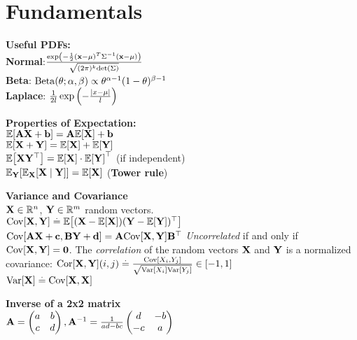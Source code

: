 \section{Fundamentals}
\begin{framed}
    \textbf{Useful PDFs:} \\
    \textbf{Normal}:$\frac{\exp \left(-\frac{1}{2}(\mathbf{x} - \mathbf{\mu})^T \Sigma^{-1} (\mathbf{x} - \mathbf{\mu}) \right)}{\sqrt{(2\pi)^k \mathrm{det}\left(\Sigma\right)}}$ \\
    \textbf{Beta}: $\Beta[\theta]{\alpha}{\beta} \propto \theta^{\alpha-1} (1-\theta)^{\beta-1}$ \\
    \textbf{Laplace}: $\frac{1}{2l}\exp\left(-\frac{\left| x - \mu \right|}{l}\right)$
\end{framed}
\begin{framed}
    \textbf{Properties of Expectation:}\\
    $\E{\mA \rX + \vb} = \mA \E{\rX} + \vb $\\ 
    $ \E{\rX + \rY} = \E{\rX} + \E{\rY}$ \\
    $\E{\rX\transpose{\rY}} = \E{\rX} \cdot \transpose{\E{\rY}}$ (if independent)\\
    $\E[\rY]{\E[\rX]{\rX \mid \rY}} = \E{\rX}$ (\textbf{Tower rule})
\end{framed} 
\begin{framed}
    \textbf{Variance and Covariance}\\
$\mathbf{X}\in \mathbb{R}^n$, $\mathbf{Y} \in \mathbb{R}^m$ random vectors.\\
  $\Cov{\rX, \rY} \defeq \E{(\rX - \E{\rX})\transpose{(\rY - \E{\rY})}}$\\
$\Cov{\mA\rX + \vc, \mB\rY + \vd} = \mA\Cov{\rX,\rY}\transpose{\mB}$
\emph{Uncorrelated} if and only if $\Cov{\rX, \rY} = \mzero$.
The \emph{correlation} of the random vectors $\mathbf{X}$ and $\mathbf{Y}$ is a normalized covariance: $\Cor{\rX,\rY}(i,j) \defeq \frac{\Cov{X_i,Y_j}}{\sqrt{\Var{X_i} \Var{Y_j}}} \in [-1,1]$\\
$\Var{\rX} \defeq \Cov{\rX, \rX}$ \\
\end{framed}
\begin{framed}
    \textbf{Inverse of a 2x2 matrix}\\
    $\mathbf{A}=\begin{pmatrix}a&b\\c&d\end{pmatrix}, \mathbf{A}^{-1}=\frac{1}{ad-bc}\begin{pmatrix}d&-b\\-c&a\end{pmatrix}$
\end{framed}
